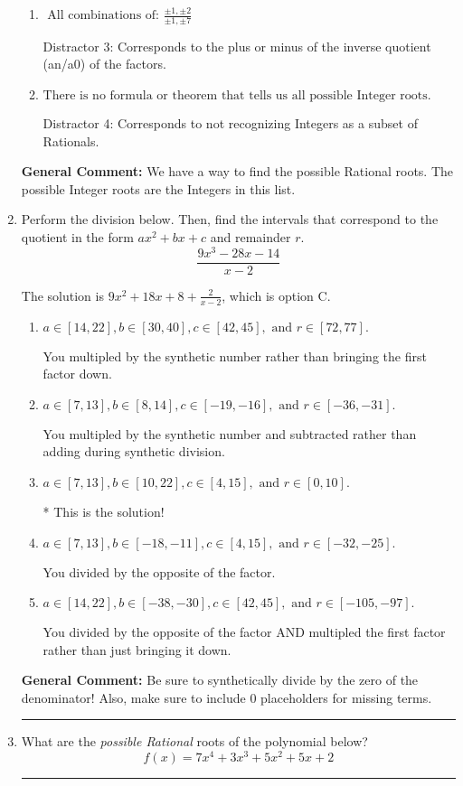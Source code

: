 \documentclass{extbook}[14pt]
\newcommand{\litem}[1]{\item #1

\rule{\textwidth}{0.4pt}}
\begin{document}
\begin{enumerate}
{\begin{enumerate}[label=\Alph*.]
This would have been the solution \textbf{if asked for the possible Rational roots}!
\item \( \text{ All combinations of: }\frac{\pm 1,\pm 2}{\pm 1,\pm 7} \)

 Distractor 3: Corresponds to the plus or minus of the inverse quotient (an/a0) of the factors. 
\item \( \text{There is no formula or theorem that tells us all possible Integer roots.} \)

 Distractor 4: Corresponds to not recognizing Integers as a subset of Rationals.
\end{enumerate}

\textbf{General Comment:} We have a way to find the possible Rational roots. The possible Integer roots are the Integers in this list.
}
\litem{
Perform the division below. Then, find the intervals that correspond to the quotient in the form $ax^2+bx+c$ and remainder $r$.
\[ \frac{9x^{3} -28 x -14}{x -2} \]

The solution is \( 9x^{2} +18 x + 8 + \frac{2}{x -2} \), which is option C.\begin{enumerate}[label=\Alph*.]
\item \( a \in [14, 22], b \in [30, 40], c \in [42, 45], \text{ and } r \in [72, 77]. \)

 You multipled by the synthetic number rather than bringing the first factor down.
\item \( a \in [7, 13], b \in [8, 14], c \in [-19, -16], \text{ and } r \in [-36, -31]. \)

 You multipled by the synthetic number and subtracted rather than adding during synthetic division.
\item \( a \in [7, 13], b \in [10, 22], c \in [4, 15], \text{ and } r \in [0, 10]. \)

* This is the solution!
\item \( a \in [7, 13], b \in [-18, -11], c \in [4, 15], \text{ and } r \in [-32, -25]. \)

 You divided by the opposite of the factor.
\item \( a \in [14, 22], b \in [-38, -30], c \in [42, 45], \text{ and } r \in [-105, -97]. \)

 You divided by the opposite of the factor AND multipled the first factor rather than just bringing it down.
\end{enumerate}

\textbf{General Comment:} Be sure to synthetically divide by the zero of the denominator! Also, make sure to include 0 placeholders for missing terms.
}
\litem{
What are the \textit{possible Rational} roots of the polynomial below?
\[ f(x) = 7x^{4} +3 x^{3} +5 x^{2} +5 x + 2 \]

}
\end{enumerate}
\end{document}
